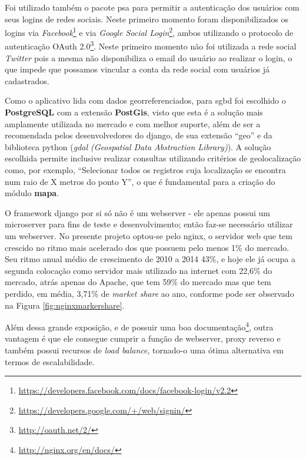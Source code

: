 Foi utilizado também o pacote \gls{psa} para permitir a autenticação dos usuários com seus logins de redes sociais. Neste primeiro momento foram disponibilizados os logins via \textit{Facebook}\footnote{\url{https://developers.facebook.com/docs/facebook-login/v2.2}} e via \textit{Google Social Login}\footnote{\url{https://developers.google.com/+/web/signin/}}, ambos utilizando o protocolo de autenticação OAuth 2.0\footnote{\url{http://oauth.net/2/}}. Neste primeiro momento não foi utilizada a rede social \textit{Twitter} pois a mesma não disponibiliza o email do usuário ao realizar o login, o que impede que possamos vincular a conta da rede social com usuários já cadastrados.

Como o aplicativo lida com dados georreferenciados, para \gls{sgbd} foi escolhido o \textbf{PostgreSQL} com a extensão \textbf{PostGis}, visto que esta é a solução mais amplamente utilizada no mercado e com melhor suporte, além de ser a recomendada pelos desenvolvedores do \gls{django}, de sua extensão ``geo'' e da biblioteca python (\textit{gdal (Geospatial Data Abstraction Library)}). A solução escolhida permite inclusive realizar consultas utilizando critérios de geolocalização como, por exemplo, ``Selecionar todos os registros cuja localização se encontra num raio de X metros do ponto Y'', o que é fundamental para a criação do módulo \textbf{mapa}.

O framework \gls{django} por si só não é um webserver - ele apenas possui um microserver para fins de teste e desenvolvimento; então faz-se necessário utilizar um webserver. No presente projeto optou-se pelo \gls{nginx}, o servidor web que tem crescido no ritmo mais acelerado dos que possuem pelo menos 1\% do mercado. Seu ritmo anual médio de crescimento de 2010 a 2014 43\%, e hoje ele já ocupa a segunda colocação como servidor mais utilizado na internet com 22,6\% do mercado, atrás apenas do Apache, que tem 59\% do mercado mas que tem perdido, em média, 3,71\% de \textit{market share} ao ano, conforme pode ser observado na Figura \ref{fig:nginxmarkershare}.


Além dessa grande exposição, e de possuir uma boa documentação\footnote{\url{http://nginx.org/en/docs/}}, outra vantagem é que ele consegue cumprir a função de webserver, proxy reverso e também possui recursos de \textit{load balance}, tornado-o uma ótima alternativa em termos de escalabilidade.


